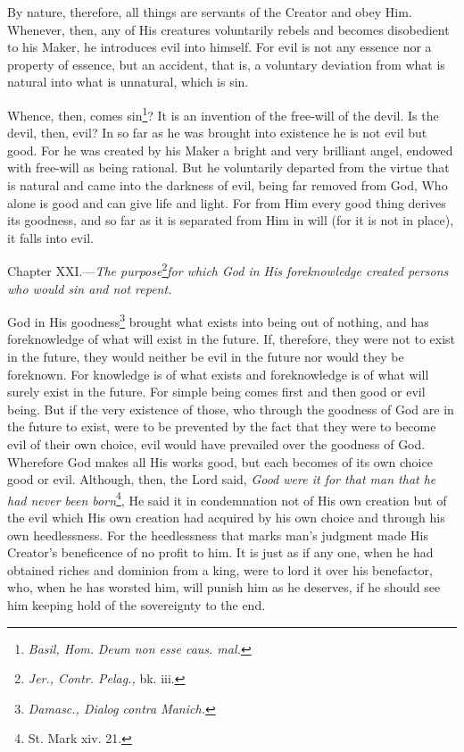 By nature, therefore, all things are servants of the Creator and obey Him. Whenever, then, any of His creatures voluntarily rebels and becomes disobedient to his Maker, he introduces evil into himself. For evil is not any essence nor a property of essence, but an accident, that is, a voluntary deviation from what is natural into what is unnatural, which is sin.

Whence, then, comes sin\footnote{\emph{Basil, Hom.} \emph{Deum non esse caus. mal.}}? It is an invention of the free-will of the devil. Is the devil, then, evil? In so far as he was brought into existence he is not evil but good. For he was created by his Maker a bright and very brilliant angel, endowed with free-will as being rational. But he voluntarily departed from the virtue that is natural and came into the darkness of evil, being far removed from God, Who alone is good and can give life and light. For from Him every good thing derives its goodness, and so far as it is separated from Him in will (for it is not in place), it falls into evil.


Chapter XXI.—\emph{The purpose}\footnote{\emph{Jer., Contr. Pelag., }bk. iii.}\emph{for which God in His foreknowledge created persons who would sin and not repent.}

God in His goodness\footnote{\emph{Damasc., Dialog contra Manich.}} brought what exists into being out of nothing, and has foreknowledge of what will exist in the future. If, therefore, they were not to exist in the future, they would neither be evil in the future nor would they be foreknown. For knowledge is of what exists and foreknowledge is of what will surely exist in the future. For simple being comes first and then good or evil being. But if the very existence of those, who through the goodness of God are in the future to exist, were to be prevented by the fact that they were to become evil of their own choice, evil would have prevailed over the goodness of God. Wherefore God makes all His works good, but each becomes of its own choice good or evil. Although, then, the Lord said, \emph{Good were it for that man that he had never been born}\footnote{St. Mark xiv. 21.}, He said it in condemnation not of His own creation but of the evil which His own creation had acquired by his own choice and through his own heedlessness. For the heedlessness that marks man’s judgment made His Creator’s beneficence of no profit to him. It is just as if any one, when he had obtained riches and dominion from a king, were to lord it over his benefactor, who, when he has worsted him, will punish him as he deserves, if he should see him keeping hold of the sovereignty to the end.

